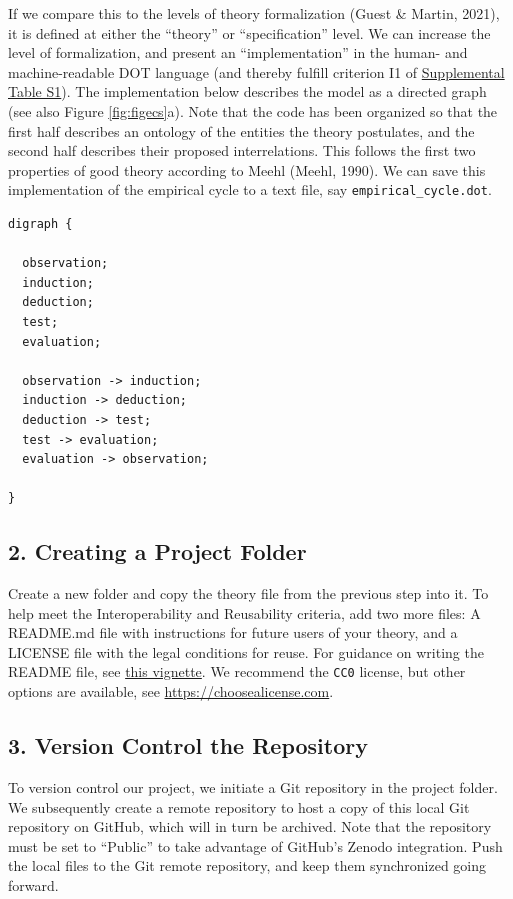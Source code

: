 \documentclass[
  man, noextraspace,floatsintext]{apa7}
\begin{document}
If we compare this to the levels of theory formalization (Guest \& Martin, 2021),
it is defined at either the ``theory'' or ``specification'' level.
We can increase the level of formalization, and present an ``implementation'' in the human- and machine-readable DOT language (and thereby fulfill criterion I1 of \href{https://github.com/cjvanlissa/fair_theory/blob/main/fair_principles.csv}{Supplemental Table S1}).
The implementation below describes the model as a directed graph (see also Figure \ref{fig:figecs}a).
Note that the code has been organized so that the first half describes an ontology of the entities the theory postulates,
and the second half describes their proposed interrelations.
This follows the first two properties of good theory according to Meehl (Meehl, 1990).
We can save this implementation of the empirical cycle to a text file, say \texttt{empirical\_cycle.dot}.

\begin{verbatim}
digraph {

  observation;
  induction;
  deduction;
  test;
  evaluation;
  
  observation -> induction;
  induction -> deduction;
  deduction -> test;
  test -> evaluation;
  evaluation -> observation;
  
}
\end{verbatim}

\subsection{2. Creating a Project Folder}\label{creating-a-project-folder}

Create a new folder and copy the theory file from the previous step into it.
To help meet the Interoperability and Reusability criteria,
add two more files:
A README.md file with instructions for future users of your theory,
and a LICENSE file with the legal conditions for reuse.
For guidance on writing the README file, see \href{https://cjvanlissa.github.io/theorytools/articles/readme.html}{this vignette}.
We recommend the \texttt{CC0} license, but other options are available, see \href{https://choosealicense.com/non-software/}{https://choosealicense.com}.

\subsection{3. Version Control the Repository}\label{version-control-the-repository}

To version control our project, we initiate a Git repository in the project folder.
We subsequently create a remote repository to host a copy of this local Git repository on GitHub, which will in turn be archived.
Note that the repository
must be set to ``Public'' to take advantage of GitHub's Zenodo integration.
Push the local files to the Git remote repository, and keep them synchronized going forward.
\end{document}

